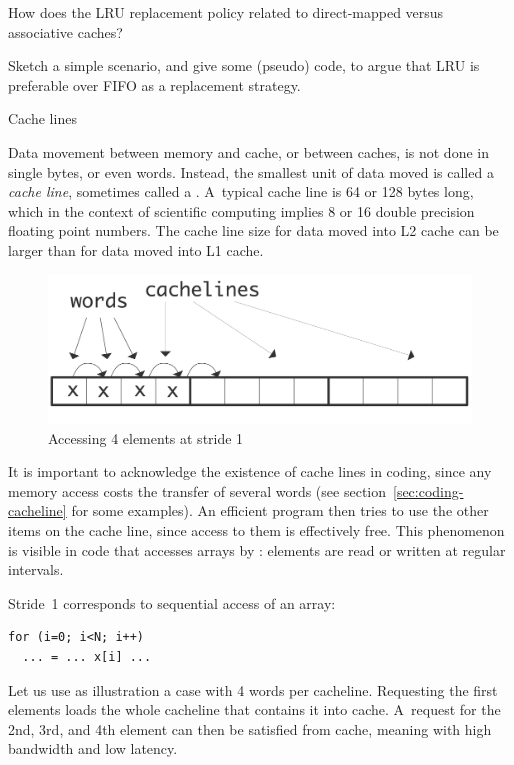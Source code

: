 \begin{exercise}
  How does the LRU replacement policy related to direct-mapped versus
  associative caches?
\end{exercise}

\begin{exercise}
  Sketch a simple scenario, and give some (pseudo) code, to argue that
  LRU is preferable over FIFO as a replacement strategy.
\end{exercise}


 {Cache lines}
\label{sec:cacheline}\label{sec:stride}

Data movement between memory and cache, or between caches, is not done
in single bytes, or even words. Instead, the smallest unit of data
moved is called a \emph{cache line}, sometimes called a
.  A~typical cache line is 64 or 128 bytes
long, which in the context of scientific computing implies 8 or 16
double precision floating point numbers. The cache line size for data
moved into L2 cache can be larger than for data moved into L1 cache.

\begin{figure}
  \includegraphics[scale=.07]{graphics/stride-1}
  \caption{Accessing 4 elements at stride 1}
  \label{fig:stride-1}
\end{figure}
%
It is important to acknowledge the existence of cache lines in coding,
since any memory access costs the transfer of several words (see
section~\ref{sec:coding-cacheline} for some examples). An
efficient program then tries to use the other items on the cache line,
since access to them is effectively free. This phenomenon is visible in
code that accesses arrays by : elements are read or
written at regular intervals.

Stride~1 corresponds to sequential access of an array:
\begin{verbatim}
for (i=0; i<N; i++)
  ... = ... x[i] ...
\end{verbatim}
Let us use as illustration a case with 4 words per cacheline. Requesting
the first elements loads the whole cacheline that contains it into
cache. A~request for the 2nd, 3rd, and 4th element can then be
satisfied from cache, meaning with high bandwidth and low latency.
\bigskip

